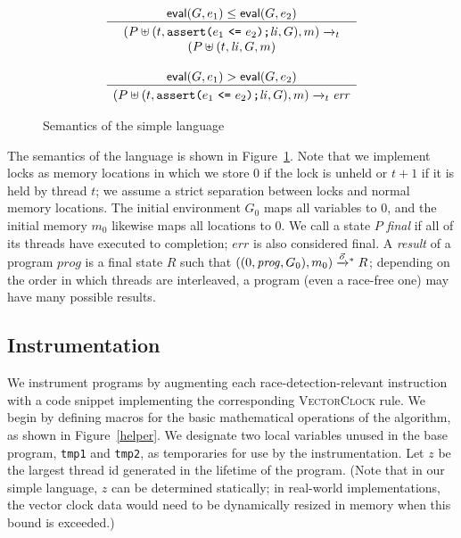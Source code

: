 \documentclass[preprint, 10pt]{sigplanconf}
\newcommand{\VCalg}{\textsc{VectorClock}\xspace}
\newcommand{\assert}[2]{\texttt{assert(}#1\ \texttt{<=}\ #2\texttt{)}}
\newcommand{\cfg}[2]{\ensuremath{(#1, #2)}}
\newcommand{\anarrow}[2]{\ensuremath{\xrightarrow{#2}_{#1}}}
\newcommand{\execstar}[4]{\ensuremath{\cfg{#1}{#2} \tto{#3} #4}}
\newcommand{\tto}[1]{\mathrel{
  \vphantom{\xrightarrow{#1}}
  \smash{\xrightarrow{#1}}
  \vphantom{\to}^{*}}
}
\begin{document}
\begin{figure}[tb]
\[\begin{array}{c}
\multicolumn{1}{c}{\mathsf{eval}(G, e_1) \le \mathsf{eval}(G, e_2)}
\\ \hline \rule{0pt}{2.5ex}
\cfg{P \uplus (t, \assert{e_1}{e_2}\texttt{;} \mathit{li}, G)}{m}
\anarrow{t}{} \\
\cfg{P \uplus (t, \mathit{li}, G}{m}
\\\\

\multicolumn{1}{c}{\mathsf{eval}(G, e_1) > \mathsf{eval}(G, e_2)}
\\ \hline \rule{0pt}{2.5ex}
\cfg{P \uplus (t, \assert{e_1}{e_2}\texttt{;} \mathit{li}, G)}{m}
\anarrow{t}{} 
\mathit{err}
\end{array}
\]







\caption{Semantics of the simple language}
\label{semantics}
\end{figure}
The semantics of the language is shown in Figure~\ref{semantics}. Note that we implement locks as memory locations in which we store 0 if the lock is unheld or $t + 1$ if it is held by thread $t$; we assume a strict separation between locks and normal memory locations. The initial environment $G_0$ maps all variables to 0, and the initial memory $m_0$ likewise maps all locations to 0. We call a state $P$ \emph{final} if all of its threads have executed to completion; $\mathit{err}$ is also considered final. A \emph{result} of a program $\mathit{prog}$ is a final state $R$ such that \execstar{(0, \mathit{prog}, G_0)}{m_0}{\vec{o}}{R}; depending on the order in which threads are interleaved, a program (even a race-free one) may have many possible results.

\subsection{Instrumentation}
We instrument programs by augmenting each race-detection-relevant instruction with a code snippet implementing the corresponding \VCalg rule. We begin by defining macros for the basic mathematical operations of the algorithm, as shown in Figure~\ref{helper}. We designate two local variables unused in the base program, \texttt{tmp1} and \texttt{tmp2}, as temporaries for use by the instrumentation. Let $z$ be the largest thread id generated in the lifetime of the program. (Note that in our simple language, $z$ can be determined statically; in real-world implementations, the vector clock data would need to be dynamically resized in memory when this bound is exceeded.)
\end{document}
